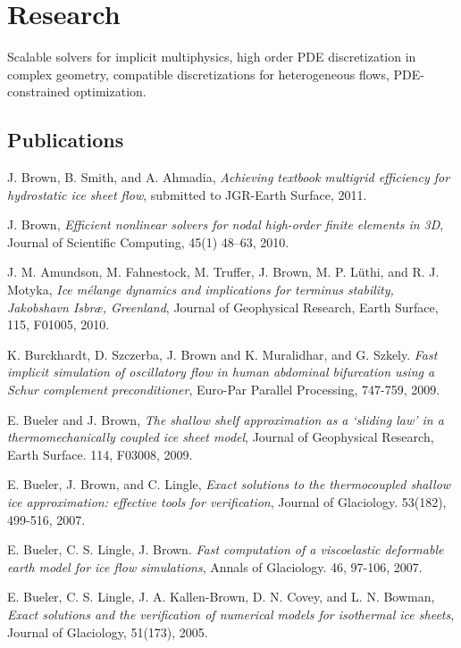 \documentclass[10pt,letterpaper]{article}
\newcommand\ptitle[1]{\textit{#1}} %
\renewenvironment{itemize}{
  \begin{list}{}{
    \setlength{\leftmargin}{1.5em}
    \setlength{\itemsep}{0.25em}
    \setlength{\parskip}{0pt}
    \setlength{\parsep}{0.25em}
  }
}{
  \end{list}
}
\begin{document}
\section*{Research}
\begin{itemize}\item Scalable solvers for implicit multiphysics, high order PDE
  discretization in complex geometry, compatible discretizations for
  heterogeneous flows, PDE-constrained optimization.
\end{itemize}
\subsection*{Publications}
\begin{itemize}
\item J. Brown, B. Smith, and A. Ahmadia, \ptitle{Achieving textbook multigrid efficiency for hydrostatic ice sheet flow}, submitted to JGR-Earth Surface, 2011.
\item J. Brown, \ptitle{Efficient nonlinear solvers for nodal high-order finite elements in 3D}, Journal of Scientific Computing, 45(1) 48--63, 2010.
\item J. M. Amundson, M. Fahnestock, M. Truffer, J. Brown, M. P. L\"uthi, and R. J. Motyka, \ptitle{Ice m\'elange dynamics and implications for terminus stability, Jakobshavn Isbr\ae, Greenland}, Journal of Geophysical Research, Earth Surface, 115, F01005, 2010.
\item K. Burckhardt, D. Szczerba, J. Brown and K. Muralidhar, and G. Szkely. \ptitle{Fast implicit simulation of oscillatory flow in human abdominal bifurcation using a Schur complement preconditioner}, Euro-Par Parallel Processing, 747-759, 2009.
\item E. Bueler and J. Brown, \ptitle{The shallow shelf approximation as a `sliding law' in a thermomechanically coupled ice sheet model}, Journal of Geophysical Research, Earth Surface. 114, F03008, 2009.
\item E. Bueler, J. Brown, and C. Lingle, \ptitle{Exact solutions to the thermocoupled shallow ice approximation: effective tools for verification}, Journal of Glaciology. 53(182), 499-516, 2007.
\item E. Bueler, C. S. Lingle, J. Brown. \ptitle{Fast computation of a viscoelastic deformable earth model for ice flow simulations}, Annals of Glaciology. 46, 97-106, 2007.
\item E. Bueler, C. S. Lingle, J. A. Kallen-Brown, D. N. Covey, and L. N. Bowman, \ptitle{Exact solutions and the verification of numerical models for isothermal ice sheets}, Journal of Glaciology, 51(173), 2005.
\end{itemize}
\end{document}
